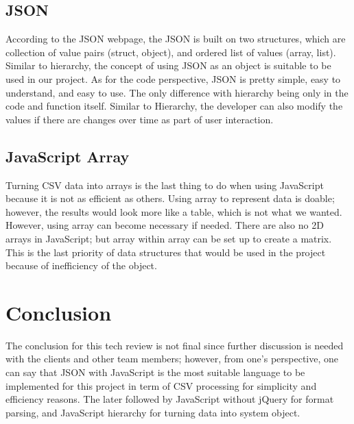 \documentclass[letterpaper,10pt,titlepage, onecolumn, draftclsnofoot]{IEEEtran}
\begin{document}
\subsection{JSON}
According to the JSON webpage\cite{json}, the JSON is built on two structures, which are collection of value pairs (struct, object), and ordered list of values (array, list). Similar to hierarchy, the concept of using JSON as an object is suitable to be used in our project. As for the code perspective, JSON is pretty simple, easy to understand, and easy to use. The only difference with hierarchy being only in the code and function itself. Similar to Hierarchy, the developer can also modify the values if there are changes over time as part of user interaction.

\subsection{JavaScript Array}
Turning CSV data into arrays is the last thing to do when using JavaScript because it is not as efficient as others. Using array to represent data is doable; however, the results would look more like a table, which is not what we wanted. However, using array can become necessary if needed. There are also no 2D arrays in JavaScript; but array within array can be set up to create a matrix. This is the last priority of data structures that would be used in the project because of inefficiency of the object.

\section{Conclusion}
The conclusion for this tech review is not final since further discussion is needed with the clients and other team members; however, from one's perspective, one can say that JSON with JavaScript is the most suitable language to be implemented for this project in term of CSV processing for simplicity and efficiency reasons. The later followed by JavaScript without jQuery for format parsing, and JavaScript hierarchy for turning data into system object.

\newpage  



\end{document}
